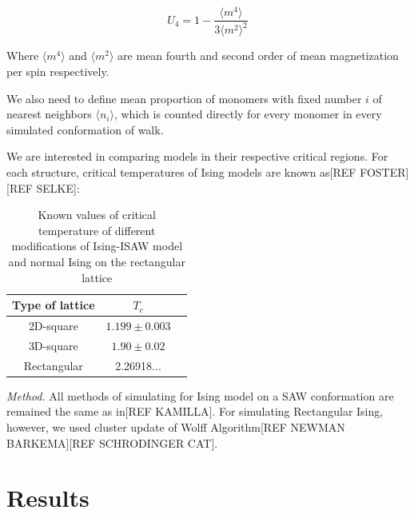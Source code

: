 \documentclass[aps,pre,amssymb,amsmath,twocolumn,floatfix]{revtex4-2}
\begin{document}
\begin{equation}
\label{eq:Cumulant}
U_{4} = 1 - \frac{\langle m^{4} \rangle}{3 \langle m^{2} \rangle^{2}}
\end{equation}

Where $\langle m^{4} \rangle$ and $\langle m^{2} \rangle$ are mean fourth and second order of mean magnetization per spin respectively.

We also need to define mean proportion of monomers with fixed number $i$ of nearest neighbors $\langle n_{i} \rangle$, which is counted directly for every monomer in every simulated conformation of walk.

We are interested in comparing models in their respective critical regions. For each structure, critical temperatures of Ising models are known as[REF FOSTER][REF SELKE]:

\begin{table}[h]
    \centering
    \begin{tabular}{|c|c|c|}
        \hline
        Type of lattice & $T_{c}$ \\ \hline
        2D-square & $1.199 \pm 0.003$ \\ \hline
        3D-square & $1.90 \pm 0.02$\\ \hline
        Rectangular & 2.26918...\\ \hline
    \end{tabular}
    \caption{Known values of critical temperature of different modifications of Ising-ISAW model and normal Ising on the rectangular lattice}
    \label{tab:my_label}
\end{table}


\textit{Method.} All methods of simulating for Ising model on a SAW conformation are remained the same as in[REF KAMILLA]. For simulating Rectangular Ising, however, we used cluster update of Wolff Algorithm[REF NEWMAN BARKEMA][REF SCHRODINGER CAT].




\section{Results}
\end{document}
